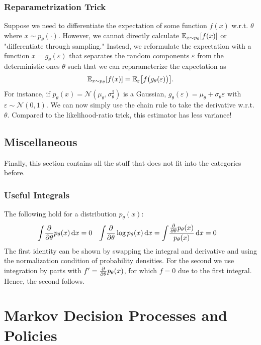 		\subsection{Reparametrization Trick}
			Suppose we need to differentiate the expectation of some function \( f(x) \) w.r.t. \(\theta\) where \( x \sim p_\theta(\cdot) \). However, we cannot directly calculate \( \mathbb{E}_{x \sim p_\theta}[f(x)] \) or "differentiate through sampling." Instead, we reformulate the expectation with a function \( x = g_\theta(\varepsilon) \) that separates the random components \(\varepsilon\) from the deterministic ones \(\theta\) such that we can reparameterize the expectation as
			\begin{equation}
				\mathbb{E}_{x \sim p_\theta}[f(x)] = \mathbb{E}_\varepsilon\bigl[ f\bigl( g_\theta(\varepsilon) \bigr) \bigr].
			\end{equation}
			For instance, if \( p_\theta(x) = \mathcal{N}(\mu_\theta, \sigma_\theta^2) \) is a Gaussian, \( g_\theta(\varepsilon) = \mu_\theta + \sigma_\theta \varepsilon \) with \( \varepsilon \sim \mathcal{N}(0, 1) \). We can now simply use the chain rule to take the derivative w.r.t. \(\theta\). Compared to the likelihood-ratio trick, this estimator has less variance!

	\section{Miscellaneous}
		Finally, this section contains all the stuff that does not fit into the categories before.

		\subsection{Useful Integrals}
			The following hold for a distribution \( p_\theta(x) \):
			\begin{align}
				\int\! \pdv{\theta} p_\theta(x) \dd{x} &= 0 &
				\int\! \pdv{\theta} \log p_\theta(x) \dd{x} &= \int\! \frac{\pdv{\theta} p_\theta(x)}{p_\theta(x)} \dd{x} = 0
			\end{align}
			The first identity can be shown by swapping the integral and derivative and using the normalization condition of probability densities. For the second we use integration by parts with \( f' = \pdv{\theta} p_\theta(x) \), for which \(f = 0\) due to the first integral. Hence, the second follows.

\chapter{Markov Decision Processes and Policies} %

